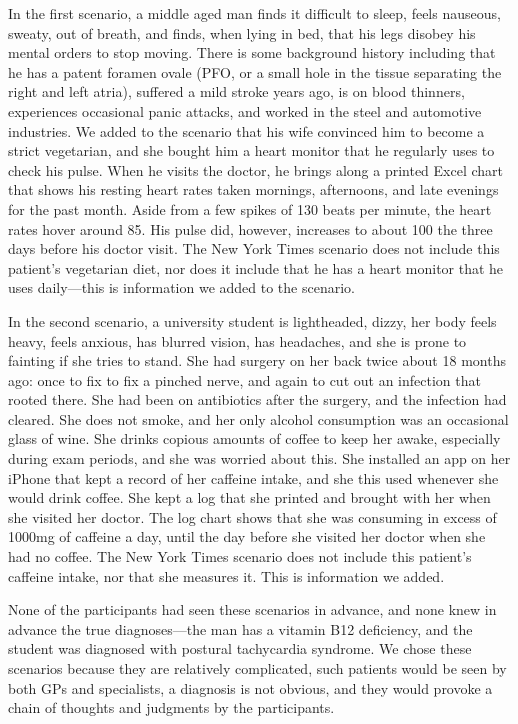 \documentclass{sigchi}
\begin{document}
In the first scenario, a middle aged man finds it difficult to sleep, feels nauseous, sweaty, out of breath, and finds, when lying in bed, that his legs disobey his mental orders to stop moving.   There is some background history including that he has a patent foramen ovale (PFO, or a small hole in the tissue separating the right and left atria), suffered a mild stroke years ago, is on blood thinners, experiences occasional panic attacks, and worked in the steel and automotive industries.  We added to the scenario that his wife convinced him to become a strict vegetarian, and she bought him a heart monitor that he regularly uses to check his pulse. When he visits the doctor, he brings along a printed Excel chart that shows his resting heart rates taken mornings, afternoons, and late evenings for the past month. Aside from a few spikes of 130 beats per minute, the heart rates hover around 85.  His pulse did, however, increases to about 100 the three days before his doctor visit.  The New York Times scenario does not include this patient’s vegetarian diet, nor does it include that he has a heart monitor that he uses daily—this is information we added to the scenario.

In the second scenario, a university student is lightheaded, dizzy, her body feels heavy, feels anxious, has blurred vision, has headaches, and she is prone to fainting if she tries to stand. She had surgery on her back twice about 18 months ago: once to fix to fix a pinched nerve, and again to cut out an infection that rooted there.  She had been on antibiotics after the surgery, and the infection had cleared.  She does not smoke, and her only alcohol consumption was an occasional glass of wine.  She drinks copious amounts of coffee to keep her awake, especially during exam periods, and she was worried about this.  She installed an app on her iPhone that kept a record of her caffeine intake, and she this used whenever she would drink coffee. She kept a log that she printed and brought with her when she visited her doctor. The log chart shows that she was consuming in excess of 1000mg of caffeine a day, until the day before she visited her doctor when she had no coffee.  The New York Times scenario does not include this patient’s caffeine intake, nor that she measures it.  This is information we added.

None of the participants had seen these scenarios in advance, and none knew in advance the true diagnoses—the man has a vitamin B12 deficiency, and the student was diagnosed with postural tachycardia syndrome.  We chose these scenarios because they are relatively complicated, such patients would be seen by both GPs and specialists, a diagnosis is not obvious, and they would provoke a chain of thoughts and judgments by the participants.
\end{document}
